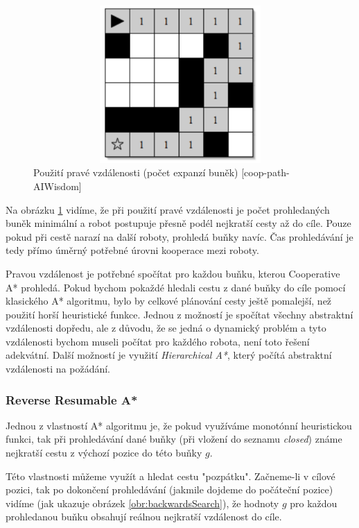 \begin{figure}[htb]
	\begin{center}
		\includegraphics*[width=15cm,height=6cm,keepaspectratio]{obr/hierarchCoopMetric}
	\end{center}
	\caption[caption]{Použití pravé vzdálenosti (počet expanzí buněk) [coop-path-AIWisdom]}
	\label{obr:hierarchCoopMetric}
\end{figure}

Na obrázku \ref{obr:hierarchCoopMetric} vidíme, že při použití pravé vzdálenosti je počet prohledaných buněk minimální a robot postupuje přesně podél nejkratší cesty až do cíle. Pouze pokud při cestě narazí na další roboty, prohledá buňky navíc. Čas prohledávání je tedy přímo úměrný potřebné úrovni kooperace mezi roboty.

Pravou vzdálenost je potřebné spočítat pro každou buňku, kterou Cooperative A* prohledá. Pokud bychom pokaždé hledali cestu z dané buňky do cíle pomocí klasického A* algoritmu, bylo by celkové plánování cesty ještě pomalejší, než použití horší heuristické funkce. Jednou z možností je spočítat všechny abstraktní vzdálenosti dopředu, ale z důvodu, že se jedná o dynamický problém a tyto vzdálenosti bychom museli počítat pro každého robota, není toto řešení adekvátní. Další možností je využití \emph{Hierarchical A*}, který počítá abstraktní vzdálenosti na požádání.

\subsubsection{Reverse Resumable A*}
Jednou z vlastností A* algoritmu je, že pokud využíváme monotónní heuristickou funkci, tak při prohledávání dané buňky (při vložení do seznamu \emph{closed}) známe nejkratší cestu z výchozí pozice do této buňky $g$.

Této vlastnosti můžeme využít a hledat cestu "pozpátku". Začneme-li v cílové pozici, tak po dokončení prohledávání (jakmile dojdeme do počáteční pozice) vidíme (jak ukazuje obrázek \ref{obr:backwardsSearch}), že hodnoty $g$ pro každou prohledanou buňku obsahují reálnou nejkratší vzdálenost do cíle.


